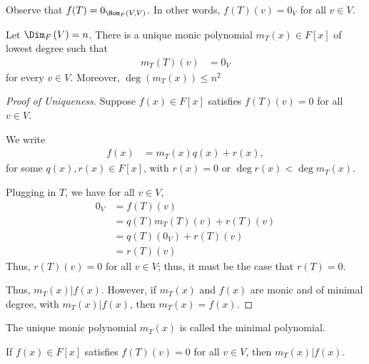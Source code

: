 \documentclass[10pt]{mypackage}
\begin{document}
Observe that $f(T) = 0_{\Hom_{F}\left(V,V\right)}$. In other words, $f\left(T\right)\left(v\right) = 0_V$ for all $v\in V$.
\begin{theorem}
  Let $\Dim_{F}\left(V\right) = n$. There is a unique monic polynomial $m_T(x) \in F[x]$ of lowest degree such that
  \begin{align*}
    m_T\left(T\right)\left(v\right) &= 0_V
  \end{align*}
  for every $v\in V$. Moreover, $\deg\left( m_T\left(x\right)\right)\leq n^2$
\end{theorem}
\begin{proof}[Proof of Uniqueness]
  Suppose $f(x) \in F[x]$ satisfies $f(T)(v) = 0$ for all $v\in V$.\newline

  We write
  \begin{align*}
    f(x) &= m_T\left(x\right)q(x) + r(x),
  \end{align*}
  for some $q(x),r(x) \in F[x]$, with $r(x) = 0$ or $\deg r(x) < \deg m_T(x)$.\newline

  Plugging in $T$, we have for all $v\in V$,
  \begin{align*}
    0_V &= f(T)(v)\\
        &= q(T)m_T(T)(v) + r(T)(v)\\
        &= q(T)\left(0_V\right) + r(T)(v)\\
        &= r(T)(v)
  \end{align*}
  Thus, $r(T) (v) = 0$ for all $v\in V$; thus, it must be the case that $r(T) = 0$.\newline

  Thus, $m_T(x)|f(x)$. However, if $m_T(x)$ and $f(x)$ are monic and of minimal degree, with $m_T(x)|f(x)$, then $m_T(x) = f(x)$.
\end{proof}
\begin{definition}
  The unique monic polynomial $m_T(x)$ is called the minimal polynomial.
\end{definition}
\begin{corollary}
  If $f(x)\in F[x]$ satisfies $f(T)(v) = 0$ for all $v\in V$, then $m_T(x)|f(x)$.
\end{corollary}
\end{document}
